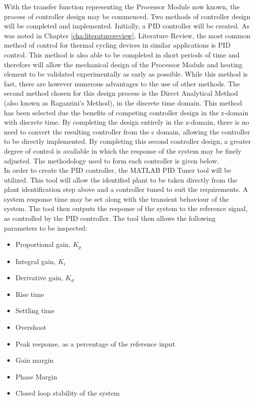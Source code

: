 With the transfer function representing the Processor Module now known, the process of controller design may be commenced. Two methods of controller design will be completed and implemented. Initially, a PID controller will be created. As was noted in Chapter \ref{cha:literaturereview}, Literature Review, the most common method of control for thermal cycling devices in similar applications is PID control. This method is also able to be completed in short periods of time and therefore will allow the mechanical design of the Processor Module and heating element to be validated experimentally as early as possible. While this method is fast, there are however numerous advantages to the use of other methods. The second method chosen for this design process is the Direct Analytical Method (also known as Ragazzini's Method), in the discrete time domain.  This method has been selected due the benefits of competing controller design in the z-domain with discrete time. By completing the design entirely in the z-domain, there is no need to convert the resulting controller from the s domain, allowing the controller to be directly implemented. By completing this second controller design, a greater degree of control is available in which the response of the system may be finely adjusted. The methodology used to form each controller is given below.\\

In order to create the PID controller, the MATLAB PID Tuner tool will be utilized. This tool will allow the identified plant to be taken directly from the plant identification step above and a controller tuned to suit the requirements. A system response time may be set along with the transient behaviour of the system. The tool then outputs the response of the system to the reference signal, as controlled by the PID controller. The tool then allows the following parameters to be inspected:
\begin{itemize}
	\item Proportional gain, $K_p$
	\item Integral gain, $K_i$
	\item Derivative gain, $K_d$
	\item Rise time
	\item Settling time
	\item Overshoot
	\item Peak response, as a percentage of the reference input
	\item Gain margin
	\item Phase Margin
	\item Closed loop stability of the system
\end{itemize}

